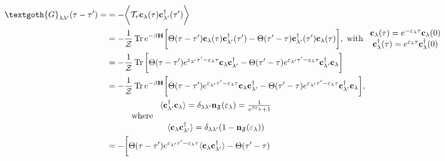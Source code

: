 \begin{equation}
\begin{split}
    \textgoth{G}_{\lambda \lambda'}(\tau - \tau') =
    &= - \bigg \langle \mathcal{T}_{\tau} {\bf c}_{\lambda}(\tau) {\bf c}_{\lambda'}^\dagger(\tau') \bigg \rangle \\
    &= - \frac{1}{\mathcal{Z}} \Tr e^{-\beta {\bf H}} \bigg[\Theta(\tau - \tau') {\bf c}_{\lambda}(\tau) {\bf c}_{\lambda'}^\dagger(\tau') - \Theta(\tau' - \tau) {\bf c}_{\lambda'}^\dagger(\tau') {\bf c}_{\lambda}(\tau) \bigg], \textnormal{ with } \begin{array}{cc}
         {\bf c}_{\lambda}(\tau) = e^{-\varepsilon_{\lambda} \tau} {\bf c}_{\lambda}(0) \\
         {\bf c}_{\lambda}^\dagger(\tau) = e^{\varepsilon_{\lambda} \tau} {\bf c}_{\lambda}^\dagger(0)
    \end{array} \\
    &= - \frac{1}{\mathcal{Z}} \Tr \bigg[
    \Theta(\tau - \tau') 
    e^{\varepsilon_{\lambda'} \tau'-\varepsilon_{\lambda} \tau} {\bf c}_{\lambda} {\bf c}_{\lambda'}^\dagger
    - \Theta(\tau' - \tau) 
    e^{\varepsilon_{\lambda'} \tau' - \varepsilon_{\lambda} \tau} {\bf c}_{\lambda'}^\dagger {\bf c}_{\lambda}
    \bigg] \\
    &= - \frac{1}{\mathcal{Z}} \Tr e^{-\beta {\bf H}}
    \bigg[
    \Theta(\tau - \tau') 
    e^{\varepsilon_{\lambda'} \tau'-\varepsilon_{\lambda} \tau} {\bf c}_{\lambda} {\bf c}_{\lambda'}^\dagger
    - \Theta(\tau' - \tau) 
    e^{\varepsilon_{\lambda'} \tau' - \varepsilon_{\lambda} \tau} {\bf c}_{\lambda'}^\dagger {\bf c}_{\lambda}
    \bigg], \\
    & \blanky \blanky \blanky \blanky \blanky \blanky \blanky \blanky \textnormal{ where } \begin{array}{cc}
         \langle {\bf c}_{\lambda'}^\dagger {\bf c}_{\lambda} \rangle = \delta_{\lambda \lambda'} {\bf n}_{\mathfrak{F}}(\varepsilon_{\lambda}) = \frac{1}{e^{\beta \varepsilon_{\lambda}} + 1} \\
         \\
         \langle {\bf c}_{\lambda} {\bf c}_{\lambda'}^\dagger \rangle = \delta_{\lambda \lambda'} ( 1 - {\bf n}_{\mathfrak{F}}(\varepsilon_{\lambda}) )
    \end{array}  \\
    &= -  
    \bigg[
    \Theta(\tau - \tau') 
    e^{\varepsilon_{\lambda'} \tau'-\varepsilon_{\lambda} \tau} \langle {\bf c}_{\lambda} {\bf c}_{\lambda'}^\dagger \rangle
    - \Theta(\tau' - \tau) 

\end{split}
\end{equation}

